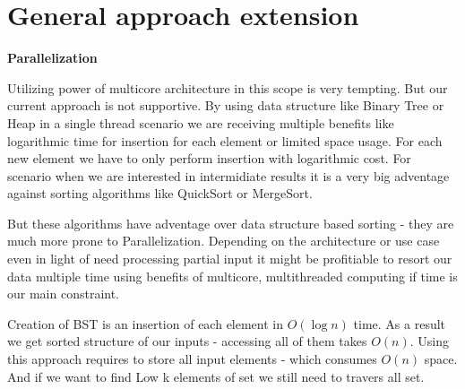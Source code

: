 \section*{General approach extension}
\noindent \textbf{Parallelization}

Utilizing power of multicore architecture in this scope is very tempting.
But our current approach is not supportive. By using data structure like Binary Tree
or Heap in a single thread scenario we are receiving multiple benefits like logarithmic time 
for insertion for each element or limited space usage. For each new element we have to only perform
insertion with logarithmic cost. For scenario when we are interested in intermidiate results it is 
a very big adventage against sorting algorithms like QuickSort or MergeSort.

But these algorithms have adventage over data structure based sorting - they are much
more prone to Parallelization. Depending on the architecture or use case even in light 
of need processing partial input it might be profitiable to resort our data multiple
time using benefits of multicore, multithreaded computing if time is our main constraint.

Creation of BST is an insertion of each element in $O(\log{}n)$ time. As a result 
we get sorted structure of our inputs - accessing all of them takes $O(n)$.
Using this approach requires to store all input elements - which consumes $O(n)$ space. 
And if we want to find Low k elements of set we still need to travers all set.

